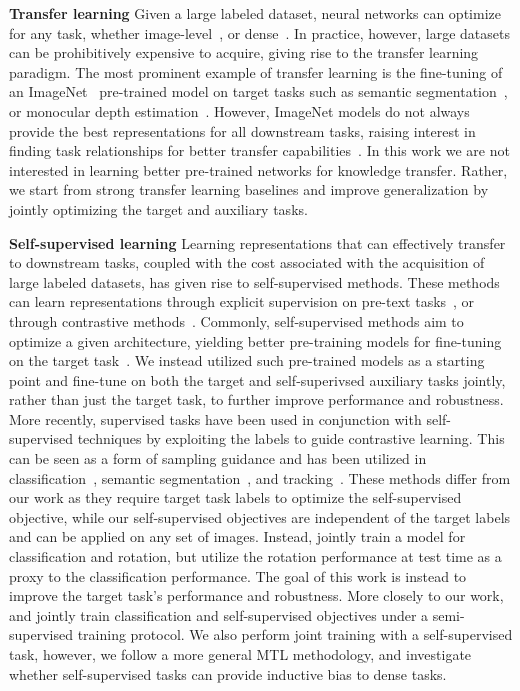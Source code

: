 \documentclass[10pt,twocolumn,letterpaper]{article}
\newcommand{\parsection}[1]{\vspace{1mm}\noindent\textbf{#1 }}
\begin{document}
\parsection{Transfer learning} 
Given a large labeled dataset, neural networks can optimize for any task, whether image-level~\cite{krizhevsky2012imagenet}, or dense~\cite{he2019rethinking}. 
In practice, however, large datasets can be prohibitively expensive to acquire, giving rise to the transfer learning paradigm.
The most prominent example of transfer learning is the fine-tuning of an ImageNet~\cite{deng2009imagenet} pre-trained model on target tasks such as semantic segmentation~\cite{long2015fully}, or monocular depth estimation~\cite{fu2018deep}. 
However, ImageNet models do not always provide the best representations for all downstream tasks, raising interest in finding task relationships for better transfer capabilities~\cite{zamir2018taskonomy}. 
In this work we are not interested in learning better pre-trained networks for knowledge transfer.
Rather, we start from strong transfer learning baselines and improve generalization by jointly optimizing the target and auxiliary tasks.

\parsection{Self-supervised learning}
Learning representations that can effectively transfer to downstream tasks, coupled with the cost associated with the acquisition of large labeled datasets, has given rise to self-supervised methods. 
These methods can learn representations through explicit supervision on pre-text tasks~\cite{doersch2015unsupervised,gidaris2018unsupervised}, or through contrastive methods~\cite{chen2020simple,he2020momentum}. 
Commonly, self-supervised methods aim to optimize a given architecture, yielding better pre-training models for fine-tuning on the target task~\cite{doersch2015unsupervised,gidaris2018unsupervised,chen2020simple,he2020momentum,ghiasi2021multi,wang2020dense,newell2020useful,li2022univip}.
We instead utilized such pre-trained models as a starting point and fine-tune on both the target and self-superivsed auxiliary tasks jointly, rather than just the target task, to further improve performance and robustness.
More recently, supervised tasks have been used in conjunction with self-supervised techniques by exploiting the labels to guide contrastive learning.
This can be seen as a form of sampling guidance and has been utilized in classification~\cite{khosla2020supervised}, semantic segmentation~\cite{wang2021exploring}, and tracking~\cite{pang2021quasi}.
These methods differ from our work as they require target task labels to optimize the self-supervised objective, while our self-supervised objectives are independent of the target labels and can be applied on any set of images.
Instead, \cite{deng2021does} jointly train a model for classification and rotation, but utilize the rotation performance at test time as a proxy to the classification performance.
The goal of this work is instead to improve the target task's performance and robustness.
More closely to our work, \cite{gidaris2019boosting} and \cite{zhai2019s4l} jointly train classification and self-supervised objectives under a semi-supervised training protocol.
We also perform joint training with a self-supervised task, however, we follow a more general MTL methodology, and investigate whether self-supervised tasks can provide inductive bias to dense tasks.
\end{document}
